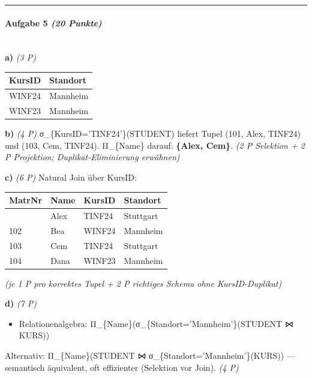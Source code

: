 \documentclass[11pt, a4paper]{article}
\begin{document}
\noindent\textcolor{rulegray}{\rule{\linewidth}{0.4pt}}


\paragraph{Aufgabe 5 \textit{(20 Punkte)}}\mbox{}\\[2pt]

\textbf{a)} \textit{(3 P)}



{\small
\begin{tabularx}{\linewidth}{XX}
\hline
\rowcolor{tableheadbg}
{\color{white}\textbf{KursID}} & {\color{white}\textbf{Standort}} \\[2pt]
\hline
\endhead
\hline
\endfoot
WINF24 & Mannheim \\
WINF23 & Mannheim \\
\end{tabularx}
}


\textbf{b)} \textit{(4 P)} σ\_\{KursID='TINF24'\}(STUDENT) liefert Tupel (101, Alex, TINF24) und (103, Cem, TINF24). Π\_\{Name\} darauf: \textbf{\{Alex, Cem\}}. \textit{(2 P Selektion + 2 P Projektion; Duplikat-Eliminierung erwähnen)}


\textbf{c)} \textit{(6 P)} Natural Join über KursID:



{\small
\begin{tabularx}{\linewidth}{XXXX}
\hline
\rowcolor{tableheadbg}
{\color{white}\textbf{MatrNr}} & {\color{white}\textbf{Name}} & {\color{white}\textbf{KursID}} & {\color{white}\textbf{Standort}} \\[2pt]
\hline
\endhead
\hline
\endfoot
101 & Alex & TINF24 & Stuttgart \\
102 & Bea & WINF24 & Mannheim \\
103 & Cem & TINF24 & Stuttgart \\
104 & Dana & WINF23 & Mannheim \\
\end{tabularx}
}


\textit{(je 1 P pro korrektes Tupel + 2 P richtiges Schema ohne KursID-Duplikat)}


\textbf{d)} \textit{(7 P)}

\begin{itemize}
  \item Relationenalgebra: Π\_\{Name\}(σ\_\{Standort='Mannheim'\}(STUDENT ⋈ KURS))
\end{itemize}
Alternativ: Π\_\{Name\}(STUDENT ⋈ σ\_\{Standort='Mannheim'\}(KURS)) — semantisch äquivalent, oft effizienter (Selektion vor Join). \textit{(4 P)}
\end{document}
